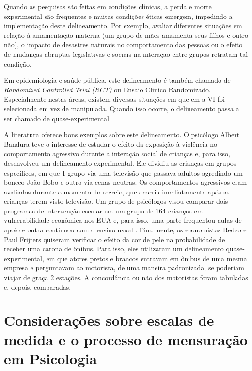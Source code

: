 \documentclass[
]{book}
\begin{document}
Quando as pesquisas são feitas em condições clínicas, a perda e morte experimental são frequentes e muitas condições éticas emergem, impedindo a implementação deste delineamento. Por exemplo, avaliar diferentes situações em relação à amamentação materna (um grupo de mães amamenta seus filhos e outro não), o impacto de desastres naturais no comportamento das pessoas ou o efeito de mudanças abruptas legislativas e sociais na interação entre grupos retratam tal condição.

Em epidemiologia e saúde pública, este delineamento é também chamado de \emph{Randomized Controlled Trial (RCT)} ou Ensaio Clínico Randomizado. Especialmente nestas áreas, existem diversas situações em que em a VI foi selecionada em vez de manipulada. Quando isso ocorre, o delineamento passa a ser chamado de quase-experimental.

A literatura oferece bons exemplos sobre este delineamento. O psicólogo Albert Bandura \citeyearpar{Bandura1961} teve o interesse de estudar o efeito da exposição à violência no comportamento agressivo durante a interação social de crianças e, para isso, desenvolveu um delineamento experimental. Ele dividiu as crianças em grupos específicos, em que 1 grupo via uma televisão que passava adultos agredindo um boneco João Bobo e outro via cenas neutras. Os comportamentos agressivos eram avaliados durante o momento do recreio, que ocorria imediatamente após as crianças terem visto televisão. Um grupo de psicólogos visou comparar dois programas de intervenção escolar em um grupo de 164 crianças em vulnerabilidade econômica nos EUA e, para isso, uma parte frequentou aulas de apoio e outra continuou com o ensino usual \citep{Feil2020}.
Finalmente, os economistas Redzo e Paul Frijters \citeyearpar{Mujcic2020} quiseram verificar o efeito da cor de pele na probabilidade de receber uma carona de ônibus. Para isso, eles utilizaram um delineamento quase-experimental, em que atores pretos e brancos entravam em ônibus de uma mesma empresa e perguntavam ao motorista, de uma maneira padronizada, se poderiam viajar de graça 2 estações. A concordância ou não dos motoristas foram tabuladas e, depois, comparadas.

\hypertarget{considerauxe7uxf5es-sobre-escalas-de-medida-e-o-processo-de-mensurauxe7uxe3o-em-psicologia}{%
\section{Considerações sobre escalas de medida e o processo de mensuração em Psicologia}\label{considerauxe7uxf5es-sobre-escalas-de-medida-e-o-processo-de-mensurauxe7uxe3o-em-psicologia}}
\end{document}
